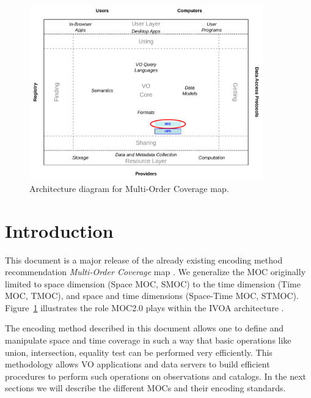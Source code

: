 \documentclass[11pt,a4paper]{ivoa}
\begin{document}
\begin{figure}[!htbp]
\begin{center}
\includegraphics[width=0.9\textwidth]{role_diagram.pdf}
\end{center}
\caption[IVOA architecture diagram]{Architecture diagram for Multi-Order Coverage map.}
\label{fig:ivoadiagram}
\end{figure}

\section{Introduction}
This document is a major release of
the already existing encoding method recommendation \emph{Multi-Order
  Coverage} map \citep[MOC~1.1,][]{2019ivoa.spec.1007F}. We generalize the MOC
originally limited to space dimension (Space MOC, SMOC) to the time
dimension (Time MOC, TMOC), and space and time dimensions (Space-Time
MOC, STMOC). Figure~\ref{fig:ivoadiagram} illustrates the role MOC2.0
plays within the IVOA architecture \citep{2021ivoa.spec.1101D}.

The encoding method described in this document allows one to define
and manipulate space and time coverage in such a way that basic
operations like union, intersection, equality test can be performed
very efficiently. This methodology allows VO applications and
data servers to build efficient
procedures to perform such operations on observations and catalogs. 
In the next sections we will describe the different MOCs and their
encoding standards.
\end{document}
